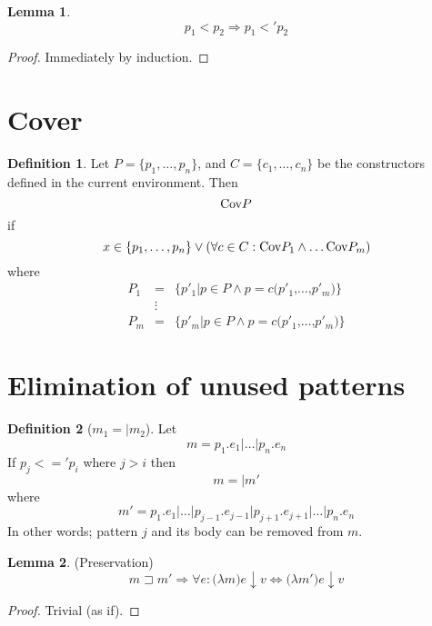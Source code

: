\documentclass[a4paper, oneside, draft]{memoir}
\theoremstyle{definition}
\newtheorem{definition}{Definition}
\newtheorem{lemma}{Lemma}
\begin{document}
\begin{lemma}\label{tot-imp-part}
  \[
  p_1 < p_2 \Rightarrow p_1 <' p_2
  \]
\end{lemma}
\begin{proof}
  Immediately by induction.
\end{proof}

\section{Cover}

\begin{definition}
  Let $P = \{p_1, \ldots, p_n \}$, and $C = \{c_1, \ldots, c_n\}$ be the constructors
  defined in the current environment. Then
  \[
  \textnormal{Cov}P
  \]
if
\[
  x \in \{p_1, \ldots, p_n \} \lor (\forall c \in C : \textnormal{Cov} P_1 \land
  \ldots \textnormal{Cov} P_m)
\]
where
\begin{eqnarray*}
P_1 &=& \{p'_1 | p \in P \land p = c \texttt{(}p'_1\texttt{,}\ldots\texttt{,}p'_m\texttt{)}\}\\
&\vdots&\\
P_m &=& \{p'_m | p \in P \land p = c \texttt{(}p'_1\texttt{,}\ldots\texttt{,}p'_m\texttt{)}\}
\end{eqnarray*}
\end{definition}

\section{Elimination of unused patterns}\label{sec:elim-unus-patt}
\begin{definition}[$m_1 =| m_2$]
  Let
  \[
  m = p_1\texttt{.}e_1 \texttt{|} \ldots \texttt{|} p_n\texttt{.}e_n
  \]
  If $p_j <=' p_i$ where $j > i$ then 
  \[
  m =| m'
  \]
  where
  \[
  m' = p_1\texttt{.}e_1 \texttt{|} \ldots \texttt{|}
  p_{j-1}\texttt{.}e_{j-1} \texttt{|} p_{j+1}\texttt{.}e_{j+1} \texttt{|}
  \ldots \texttt{|} p_n\texttt{.}e_n
  \]
  In other words; pattern $j$ and its body can be removed from $m$.
\end{definition}

\begin{lemma}(Preservation)
  \[
  m \sqsupset m' \Rightarrow \forall e : \texttt{(}\lambda m\texttt{)}e \downarrow
  v \Leftrightarrow \texttt{(}\lambda m'\texttt{)}e \downarrow v
  \]
\end{lemma}
\begin{proof}
  Trivial (as if).
\end{proof}
\end{document}
